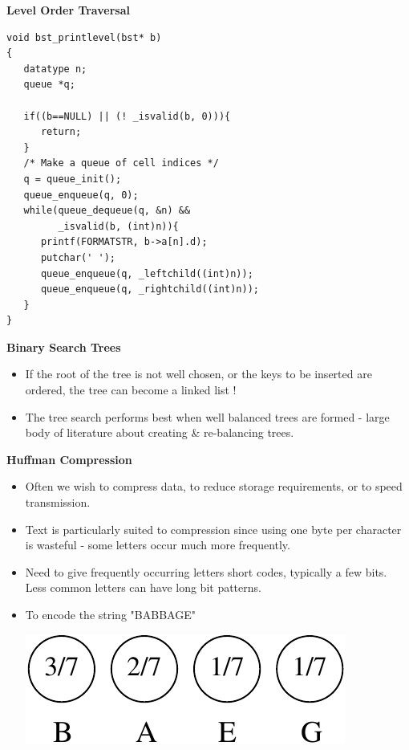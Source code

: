 \documentclass[a4,portraitt]{slides}
\begin{document}
{\newpage
{\samepage
\begin{center}
{\Large{\bf Level Order Traversal}}
\end{center}
\begin{verbatim}
void bst_printlevel(bst* b)
{
   datatype n;
   queue *q;

   if((b==NULL) || (! _isvalid(b, 0))){
      return;
   }
   /* Make a queue of cell indices */
   q = queue_init();
   queue_enqueue(q, 0);
   while(queue_dequeue(q, &n) &&
         _isvalid(b, (int)n)){
      printf(FORMATSTR, b->a[n].d);
      putchar(' ');
      queue_enqueue(q, _leftchild((int)n));
      queue_enqueue(q, _rightchild((int)n));
   }
}
\end{verbatim}
}

\newpage
{\samepage
\begin{center}
{\Large{\bf Binary Search Trees}}
\end{center}
\begin{itemize}
\item  If the root of the tree is not well chosen, or the keys to be inserted are ordered, the tree can become a linked list !
\item The tree search performs best when well balanced trees are formed - large
body of literature about creating \& re-balancing trees.
\end{itemize}
}






\newpage
{\samepage
\begin{center}
{\Large{\bf Huffman Compression}}
\end{center}
\begin{itemize}
\item Often we wish to compress data, to reduce storage requirements, or to speed transmission.
\item  Text is particularly suited to compression since using one byte per character is wasteful - some letters occur much more frequently.
\item  Need to give frequently occurring letters short codes, typically a few bits. Less common letters can have long bit patterns.
\item To encode the string "BABBAGE"
\begin{center}
\includegraphics{../Images/huff1.pdf}
\end{center}
\end{itemize}
}

}
\end{document}
